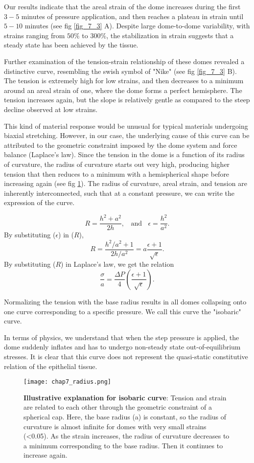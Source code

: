Our results indicate that the areal strain of the dome increases during the first $3-5$ minutes of pressure application, and then reaches a plateau in strain until $5-10$ minutes (see fig \ref{fig_7_3} A). Despite large dome-to-dome variability, with strains ranging from $50\%$ to $300\%$, the stabilization in strain suggests that a steady state has been achieved by the tissue.

Further examination of the tension-strain relationship of these domes revealed a distinctive curve, resembling the swish symbol of "Nike" (see fig \ref{fig_7_3} B). The tension is extremely high for low strains, and then decreases to a minimum around an areal strain of one, where the dome forms a perfect hemisphere. The tension increases again, but the slope is relatively gentle as compared to the steep decline observed at low strains.

This kind of material response would be unusual for typical materials undergoing biaxial stretching. However, in our case, the underlying cause of this curve can be attributed to the geometric constraint imposed by the dome system and force balance (Laplace's law). Since the tension in the dome is a function of its radius of curvature, the radius of curvature starts out very high, producing higher tension that then reduces to a minimum with a hemispherical shape before increasing again (see fig \ref{fig_7_4}). The radius of curvature, areal strain, and tension are inherently interconnected, such that at a constant pressure, we can write the expression of the curve.

$$ R = \frac{h^2 + a^2}{2h}, \ \ \ \ \text{and} \ \ \ \ \epsilon = \frac{h^2}{a^2}.$$
By substituting ($\epsilon$) in ($R$),
$$ R = \frac{h^2/a^2 + 1}{2h/a^2} = a\frac{\epsilon + 1}{\sqrt{\epsilon}}.$$
By substituting ($R$) in Laplace's law, we get the relation
$$ \frac{\sigma}{a} = \frac{\Delta P}{4} \left( \frac{\epsilon + 1}{\sqrt{\epsilon}} \right).$$

Normalizing the tension with the base radius results in all domes collapsing onto one curve corresponding to a specific pressure. We call this curve the "isobaric" curve.

In terms of physics, we understand that when the step pressure is applied, the dome suddenly inflates and has to undergo non-steady state out-of-equilibrium stresses. It is clear that this curve does not represent the quasi-static constitutive relation of the epithelial tissue.

\begin{figure}
	\centering
	\texttt{[image: chap7\_radius.png]}
	\caption{\label{fig_7_4} \textbf{Illustrative explanation for isobaric curve}: Tension and strain are related to each other through the geometric constraint of a spherical cap. Here, the base radius (a) is constant, so the radius of curvature is almost infinite for domes with very small strains (<0.05). As the strain increases, the radius of curvature decreases to a minimum corresponding to the base radius. Then it continues to increase again.	
	}
\end{figure}



